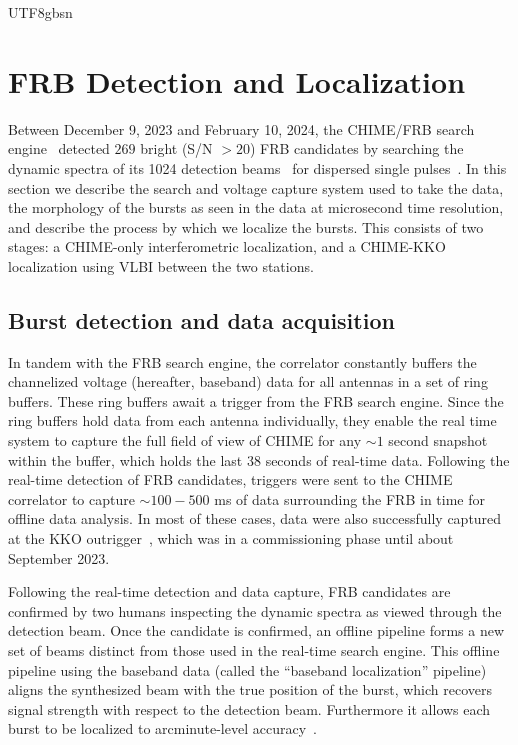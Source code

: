 \documentclass[twocolumn,linenumbers]{aastex631}
\begin{document}
\begin{CJK*}{UTF8}{gbsn}
\section{FRB Detection and Localization}\label{sec:localization}
Between December 9, 2023 and February 10, 2024, the CHIME/FRB search engine~\citep{collaboration2018chime} detected $269$ bright (S/N $> 20$) FRB candidates by searching the dynamic spectra of its 1024 detection beams~\citep{ng2017chime,masui2019algorithms} for dispersed single pulses~\citep{collaboration2018chime}. In this section we describe the search and voltage capture system used to take the data, the morphology of the bursts as seen in the data at microsecond time resolution, and describe the process by which we localize the bursts. This consists of two stages: a CHIME-only interferometric localization, and a CHIME-KKO localization using VLBI between the two stations.

\subsection{Burst detection and data acquisition}
In tandem with the FRB search engine, the correlator constantly buffers the channelized voltage (hereafter, baseband) data for all antennas in a set of ring buffers. These ring buffers await a trigger from the FRB search engine. Since the ring buffers hold data from each antenna individually, they enable the real time system to capture the full field of view of CHIME for any $\sim 1$ second snapshot within the buffer, which holds the last 38 seconds of real-time data. Following the real-time detection of FRB candidates, triggers were sent to the CHIME correlator to capture $\sim 100-500$ ms of data surrounding the FRB in time for offline data analysis. In most of these cases, data were also successfully captured at the KKO outrigger~\citep{lanman2024chime}, which was in a commissioning phase until about September 2023. 

Following the real-time detection and data capture, FRB candidates are confirmed by two humans inspecting the dynamic spectra as viewed through the detection beam. Once the candidate is confirmed, an offline pipeline forms a new set of beams distinct from those used in the real-time search engine. This offline pipeline using the baseband data (called the ``baseband localization'' pipeline) aligns the synthesized beam with the true position of the burst, which recovers signal strength with respect to the detection beam. Furthermore it allows each burst to be localized to arcminute-level accuracy~\citep{michilli2021analysis}.


\end{CJK*}
\end{document}
